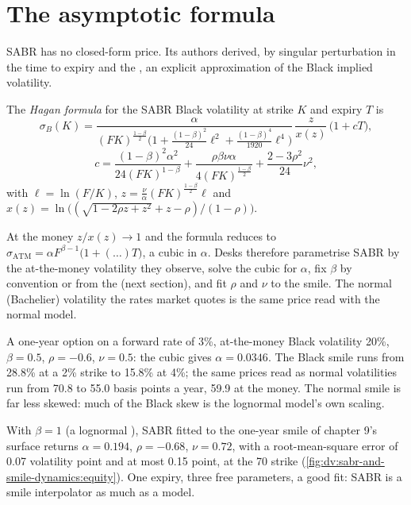 \section{The asymptotic formula}

SABR has no closed-form price. Its authors derived, by singular perturbation in the time to expiry
and the , an explicit approximation of the Black implied volatility.

\begin{definition}\label{def:dv:sabr-and-smile-dynamics:hagan}
The \emph{Hagan formula} for the SABR Black volatility at strike $K$ and expiry
$T$ is
\[
\sigma_B(K)=\frac{\alpha}{(FK)^{\frac{1-\beta}2}\bigl(1+\frac{(1-\beta)^2}{24}\ell^2+
\frac{(1-\beta)^4}{1920}\ell^4\bigr)}\,\frac{z}{x(z)}\,\bigl(1+cT\bigr),
\]
\[
c=\frac{(1-\beta)^2\alpha^2}{24(FK)^{1-\beta}}+\frac{\rho\beta\nu\alpha}{4(FK)^{\frac{1-\beta}2}}
+\frac{2-3\rho^2}{24}\nu^2,
\]
with $\ell=\ln(F/K)$, $z=\frac\nu\alpha(FK)^{\frac{1-\beta}2}\ell$ and
$x(z)=\ln\bigl((\sqrt{1-2\rho z+z^2}+z-\rho)/(1-\rho)\bigr)$.
\end{definition}

At the money $z/x(z)\to1$ and the formula reduces to
$\sigma_{\mathrm{ATM}}=\alpha F^{\beta-1}\bigl(1+(\dots)T\bigr)$, a cubic in $\alpha$. Desks therefore
parametrise SABR by the at-the-money volatility they observe, solve the cubic for $\alpha$, fix $\beta$
by convention or from the  (next section), and fit $\rho$ and $\nu$ to the smile. The normal
(Bachelier) volatility the rates market quotes is the same price read with the normal model.

\begin{example}\label{ex:dv:sabr-and-smile-dynamics:rates}
A one-year option on a forward rate of 3\%, at-the-money Black volatility 20\%, $\beta=0.5$, $\rho=-0.6$,
$\nu=0.5$: the cubic gives $\alpha=0.0346$. The Black smile runs from 28.8\% at a 2\% strike to 15.8\% at
4\%; the same prices read as normal volatilities run from 70.8 to 55.0 basis points a year, 59.9 at the money. The
normal smile is far less skewed: much of the Black skew is the lognormal model's own scaling.
\end{example}

\begin{example}\label{ex:dv:sabr-and-smile-dynamics:equity}
With $\beta=1$ (a lognormal ), SABR fitted to the one-year smile of chapter 9's surface returns
$\alpha=0.194$, $\rho=-0.68$, $\nu=0.72$, with a root-mean-square error of 0.07 volatility point and at most
0.15 point, at the 70 strike (\cref{fig:dv:sabr-and-smile-dynamics:equity}). One expiry, three free
parameters, a good fit: SABR is a smile interpolator as much as a model.
\end{example}

